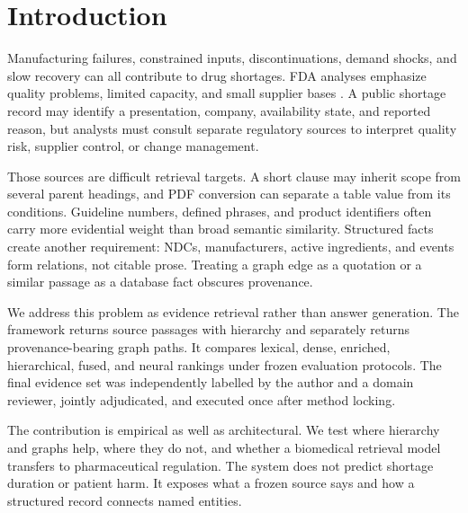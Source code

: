 \section{Introduction}
\label{sec:introduction}

Manufacturing failures, constrained inputs, discontinuations, demand shocks, and slow recovery can all contribute to drug shortages. FDA analyses emphasize quality problems, limited capacity, and small supplier bases \cite{fda2019shortages}. A public shortage record may identify a presentation, company, availability state, and reported reason, but analysts must consult separate regulatory sources to interpret quality risk, supplier control, or change management.

Those sources are difficult retrieval targets. A short clause may inherit scope from several parent headings, and PDF conversion can separate a table value from its conditions. Guideline numbers, defined phrases, and product identifiers often carry more evidential weight than broad semantic similarity. Structured facts create another requirement: NDCs, manufacturers, active ingredients, and events form relations, not citable prose. Treating a graph edge as a quotation or a similar passage as a database fact obscures provenance.

We address this problem as evidence retrieval rather than answer generation. The framework returns source passages with hierarchy and separately returns provenance-bearing graph paths. It compares lexical, dense, enriched, hierarchical, fused, and neural rankings under frozen evaluation protocols. The final evidence set was independently labelled by the author and a domain reviewer, jointly adjudicated, and executed once after method locking.

The contribution is empirical as well as architectural. We test where hierarchy and graphs help, where they do not, and whether a biomedical retrieval model transfers to pharmaceutical regulation. The system does not predict shortage duration or patient harm. It exposes what a frozen source says and how a structured record connects named entities.
